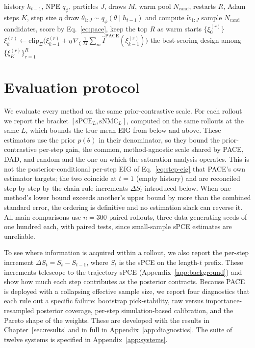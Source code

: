 \begin{algorithm}[t]
\caption{Gradient design search (PACE-grad) at step $t$}
\label{alg:grad}
\begin{algorithmic}[1]
\Require history $h_{t-1}$, NPE $q_\phi$, particles $J$, draws $M$, warm pool
$N_{\mathrm{cand}}$, restarts $R$, Adam steps $K$, step size $\eta$
\State draw $\theta_{1:J}\sim q_\phi(\theta\mid h_{t-1})$ and compute $\tilde w_{1:J}$
\State sample $N_{\mathrm{cand}}$ candidates, score by Eq.~\eqref{eq:pace}, keep the top $R$ as warm starts $\{\xi^{(r)}_0\}$
    \State $\xi^{(r)}_{k}\gets\mathrm{clip}_\Xi\!\big(\xi^{(r)}_{k-1}+\eta\,\nabla_{\xi}\,\tfrac1M\textstyle\sum_m\hat I^{\mathrm{PACE}}(\xi^{(r)}_{k-1})\big)$ 
  \EndFor
\EndFor
\State \Return the best-scoring design among $\{\xi^{(r)}_{K}\}_{r=1}^{R}$
\end{algorithmic}
\end{algorithm}

\section{Evaluation protocol}
\label{sec:m-eval}

We evaluate every method on the same prior-contrastive scale. For each rollout we
report the bracket $[\mathrm{sPCE}_L,\mathrm{sNMC}_L]$, computed on the same rollouts
at the same $L$, which bounds the true mean EIG from below and above. These estimators
use the prior $p(\theta)$ in their denominator, so they bound the prior-contrastive
per-step gain, the common, method-agnostic scale shared by PACE, DAD, and random and
the one on which the saturation analysis operates. This is not the posterior-conditional
per-step EIG of Eq.~\eqref{eq:step-eig} that PACE's own estimator targets; the two
coincide at $t{=}1$ (empty history) and are reconciled step by step by the chain-rule
increments $\Delta S_t$ introduced below. When one method's lower bound exceeds
another's upper bound by more than the combined standard error, the ordering is
definitive and no estimation slack can reverse it. All main
comparisons use $n=300$ paired rollouts, three data-generating seeds of one hundred
each, with paired tests, since small-sample sPCE estimates are unreliable.

To see where information is acquired within a rollout, we also report the per-step
increment $\Delta S_t=S_t-S_{t-1}$, where $S_t$ is the sPCE on the length-$t$ prefix.
These increments telescope to the trajectory sPCE (Appendix~\ref{app:background}) and
show how much each step contributes as the posterior contracts. Because PACE is
deployed with a collapsing effective sample size, we report four diagnostics that each
rule out a specific failure: bootstrap pick-stability, raw versus importance-resampled
posterior coverage, per-step simulation-based calibration, and the Pareto shape of the
weights. These are developed with the results in Chapter~\ref{sec:results} and in full
in Appendix~\ref{app:diagnostics}. The suite of twelve systems is specified in
Appendix~\ref{app:systems}.


